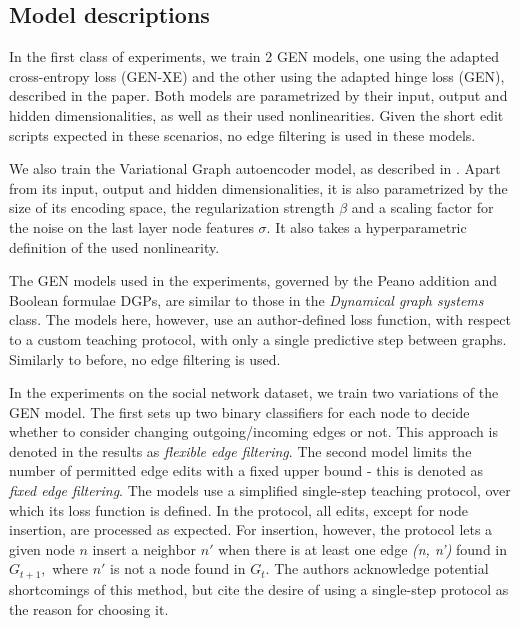 
\subsection{Model descriptions}
\label{subsec:models}
In the first class of experiments, we train 2 GEN models, one using the adapted cross-entropy loss (GEN-XE) and the other using the adapted hinge loss (GEN), described in the paper. Both models are parametrized by their input, output and hidden dimensionalities, as well as their used nonlinearities. Given the short edit scripts expected in these scenarios, no edge filtering is used in these models.

We also train the Variational Graph autoencoder model, as described in \cite{vgae}. Apart from its input, output and hidden dimensionalities, it is also parametrized by the size of its encoding space, the regularization strength $\beta$ and a scaling factor for the noise on the last layer node features $\sigma$. It also takes a hyperparametric definition of the used nonlinearity. 

The GEN models used in the experiments, governed by the Peano addition and Boolean formulae DGPs, are similar to those in the \textit{Dynamical graph systems} class. The models here, however, use an author-defined loss function, with respect to a custom teaching protocol, with only a single predictive step between graphs. Similarly to before, no edge filtering is used.


In the experiments on the social network dataset, we train two variations of the GEN model. The first sets up two binary classifiers for each node to decide whether to consider changing outgoing/incoming edges or not. This approach is denoted in the results as \textit{flexible edge filtering}. The second model limits the number of permitted edge edits with a fixed upper bound - this is denoted as \textit{fixed edge filtering}. 
The models use a simplified single-step teaching protocol, over which its loss function is defined. In the protocol, all edits, except for node insertion, are processed as expected. For insertion, however, the protocol lets a given node $n$ insert a neighbor $n'$ when there is at least one edge \textit{(n, n')} found in $G_{t+1},$ where $n'$ is not a node found in $G_{t}.$ The authors acknowledge potential shortcomings of this method, but cite the desire of using a single-step protocol as the reason for choosing it.


